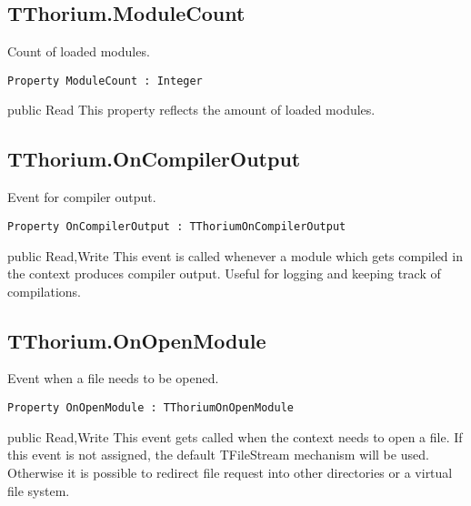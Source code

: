 \subsection{TThorium.ModuleCount}
\label{thoriumcorepkg:thorium:tthorium:modulecount}
\begin{FPCList}
\Synopsis
Count of loaded modules.\Declaration 

\begin{verbatim}
Property ModuleCount : Integer
\end{verbatim}
\Visibility
public
\Access
Read
\Description
This property reflects the amount of loaded modules.\end{FPCList}
\subsection{TThorium.OnCompilerOutput}
\label{thoriumcorepkg:thorium:tthorium:oncompileroutput}
\begin{FPCList}
\Synopsis
Event for compiler output.\Declaration 

\begin{verbatim}
Property OnCompilerOutput : TThoriumOnCompilerOutput
\end{verbatim}
\Visibility
public
\Access
Read,Write
\Description
This event is called whenever a module which gets compiled in the context produces compiler output. Useful for logging and keeping track of compilations.\end{FPCList}
\subsection{TThorium.OnOpenModule}
\label{thoriumcorepkg:thorium:tthorium:onopenmodule}
\begin{FPCList}
\Synopsis
Event when a file needs to be opened.\Declaration 

\begin{verbatim}
Property OnOpenModule : TThoriumOnOpenModule
\end{verbatim}
\Visibility
public
\Access
Read,Write
\Description
This event gets called when the context needs to open a file. If this event is not assigned, the default TFileStream mechanism will be used. Otherwise it is possible to redirect file request into other directories or a virtual file system.\end{FPCList}
